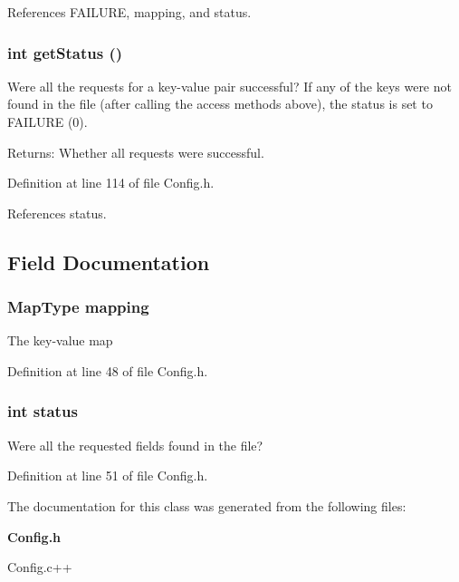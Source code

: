 References FAILURE, mapping, and status.
\subsubsection{\setlength{\rightskip}{0pt plus 5cm}int get\-Status ()\hspace{0.3cm}{\tt  [inline]}}\label{classConfig_e0959114de6692d75b6e61a7c8d8fd26}


Were all the requests for a key-value pair successful? If any of the keys were not found in the file (after calling the access methods above), the status is set to FAILURE (0).

\begin{Desc}
\item[Returns:]Whether all requests were successful. \end{Desc}


Definition at line 114 of file Config.h.

References status.

\subsection{Field Documentation}
\subsubsection{\setlength{\rightskip}{0pt plus 5cm}\bf{Map\-Type} \bf{mapping}\hspace{0.3cm}{\tt  [private]}}\label{classConfig_92935734f74efa42e183ac1428a034b1}


The key-value map 

Definition at line 48 of file Config.h.
\subsubsection{\setlength{\rightskip}{0pt plus 5cm}int \bf{status}\hspace{0.3cm}{\tt  [private]}}\label{classConfig_5f0580fcede736622ca05a2d4c34da44}


Were all the requested fields found in the file? 

Definition at line 51 of file Config.h.

The documentation for this class was generated from the following files:\begin{CompactItemize}
\item 
\bf{Config.h}\item 
Config.c++\end{CompactItemize}
